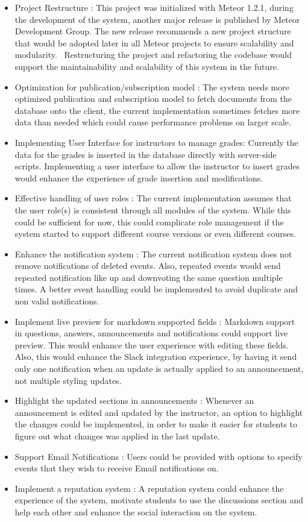 \begin{itemize}
  \item Project Restructure : This project was initialized with Meteor 1.2.1, during the development of the system, another major release
   is published by Meteor Development Group. The new release recommends a new project structure that would be adopted later in all
  Meteor projects to ensure scalability and modularity.~\cite{meteor_1_3_structure} Restructuring the project and refactoring the codebase would
  support the maintainability and scalability of this system in the future.
  \item Optimization for publication/subscription model : The system needs more optimized publication and subscription model to fetch documents
  from the database onto the client, the current implementation sometimes fetches more data than needed which could cause
  performance problems on larger scale.
  \item Implementing User Interface for instructors to manage grades: Currently the data for the grades is inserted in the database directly with
  server-side scripts. Implementing a user interface to allow the instructor to insert grades would enhance the experience of grade insertion and
  modifications.
  \item Effective handling of user roles : The current implementation assumes that the user role(s) is consistent through all modules of the system.
  While this could be sufficient for now, this could complicate role management if the system started to support different course versions or even different
  courses.
  \item Enhance the notification system : The current notification system does not remove notifications of deleted events. Also, repeated
  events would send repeated notification like up and downvoting the same question multiple times. A better event handling could be implemented
  to avoid duplicate and non valid notifications.
  \item Implement live preview for markdown supported fields : Markdown support in questions, answers, announcements and notifications could support
  live preview. This would enhance the user experience with editing these fields. Also, this would enhance the Slack\texttrademark{} integration experience,
  by having it send only one notification when an update is actually applied to an announcement, not multiple styling updates.
  \item Highlight the updated sections in announcements : Whenever an announcement is edited and updated by the instructor, an option to highlight the changes
  could be implemented, in order to make it easier for students to figure out what changes was applied in the last update.
  \item Support Email Notifications : Users could be provided with options to specify events that they wish to receive Email notifications on.
  \item Implement a reputation system : A reputation system could enhance the experience of the system, motivate students to use the discussions section and help
  each other and enhance the social interaction on the system.
\end{itemize}
